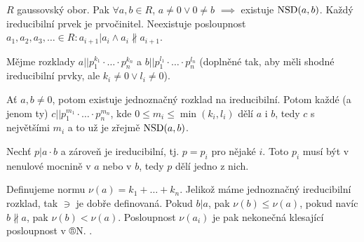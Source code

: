\documentclass[12pt]{article}                   %
\begin{document}
        \begin{dusledek}
            $R$ gaussovský obor. Pak $\forall a, b \in R$, $a≠0 \lor 0≠b$ $\implies$ existuje $\operatorname{NSD}(a, b)$. Každý ireducibilní prvek je prvočinitel. Neexistuje posloupnost $a_1, a_2, a_3, … \in R: a_{i+1}|a_i \land a_i \nparallel a_{i+1}$.

            \begin{dukazin}
                Mějme rozklady $a || p_1^{k_1}·…·p_n^{k_n}$ a $b || p_1^{l_1}·…·p_n^{l_n}$ (doplněné tak, aby měli shodné ireducibilní prvky, ale $k_i ≠ 0 \lor l_i ≠ 0$).

                Ať $a, b ≠ 0$, potom existuje jednoznačný rozklad na ireducibilní. Potom každé (a jenom ty) $c || p_1^{m_1}·…·p_n^{m_n}$, kde $0 ≤ m_i ≤ \min(k_i, l_i)$ dělí $a$ i $b$, tedy $c$ s největšími $m_i$ a to už je zřejmě $\operatorname{NSD}(a, b)$.

                Nechť $p | a·b$ a zároveň je ireducibilní, tj. $p = p_i$ pro nějaké $i$. Toto $p_i$ musí být v nenulové mocnině v $a$ nebo v $b$, tedy $p$ dělí jedno z nich.

                Definujeme normu $\nu(a) = k_1 + … + k_n$. Jelikož máme jednoznačný ireducibilní rozklad, tak $\ni$ je dobře definovaná. Pokud $b|a$, pak $\nu(b) ≤ \nu(a)$, pokud navíc $b \nparallel a$, pak $\nu(b) < \nu(a)$. Posloupnost $\nu(a_i)$ je pak nekonečná klesající posloupnost v ®N. \lightning. 
            \end{dukazin}
        \end{dusledek}
\end{document}

